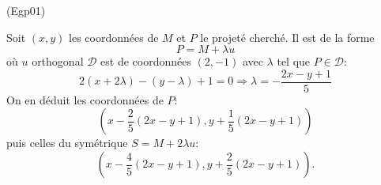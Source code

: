 \begin{tiny}(Egp01)\end{tiny} Soit $(x,y)$ les coordonnées de $M$ et $P$ le projeté cherché. Il est de la forme
\begin{displaymath}
  P = M + \lambda u
\end{displaymath}
où $u$ orthogonal $\mathcal{D}$ est de coordonnées $(2,-1)$ avec $\lambda$ tel que $P \in \mathcal{D}$:
\begin{displaymath}
  2(x+2\lambda) - (y-\lambda) + 1 = 0
  \Rightarrow
  \lambda = -\frac{2x-y+1}{5}
\end{displaymath}
On en déduit les coordonnées de $P$: 
\begin{displaymath}
(x - \frac{2}{5}(2x-y+1), y + \frac{1}{5}(2x-y+1)) 
\end{displaymath}
puis celles du symétrique $S = M + 2\lambda u$:
\begin{displaymath}
(x - \frac{4}{5}(2x-y+1), y + \frac{2}{5}(2x-y+1)).  
\end{displaymath}
